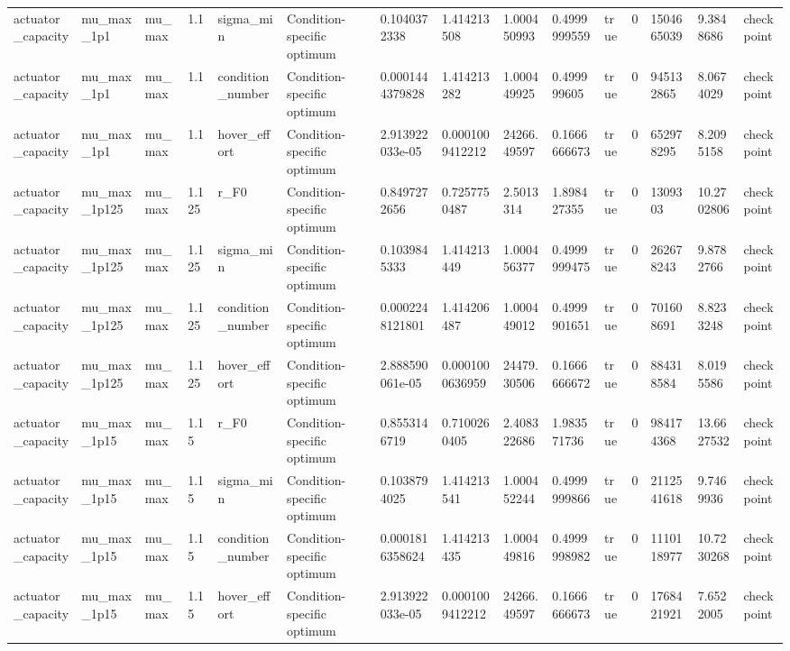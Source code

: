 \begin{tabular}{@{}lllllllllllllll@{}}
actuator\_capacity & mu\_max\_1p1 & mu\_max & 1.1 & sigma\_min & Condition-specific optimum & 0.1040372338 & 1.414213508 & 1.000450993 & 0.4999999559 & true & 0 & 1504665039 & 9.3848686 & checkpoint \\
actuator\_capacity & mu\_max\_1p1 & mu\_max & 1.1 & condition\_number & Condition-specific optimum & 0.0001444379828 & 1.414213282 & 1.000449925 & 0.499999605 & true & 0 & 945132865 & 8.0674029 & checkpoint \\
actuator\_capacity & mu\_max\_1p1 & mu\_max & 1.1 & hover\_effort & Condition-specific optimum & 2.913922033e-05 & 0.0001009412212 & 24266.49597 & 0.1666666673 & true & 0 & 652978295 & 8.2095158 & checkpoint \\
actuator\_capacity & mu\_max\_1p125 & mu\_max & 1.125 & r\_F0 & Condition-specific optimum & 0.8497272656 & 0.7257750487 & 2.5013314 & 1.898427355 & true & 0 & 1309303 & 10.2702806 & checkpoint \\
actuator\_capacity & mu\_max\_1p125 & mu\_max & 1.125 & sigma\_min & Condition-specific optimum & 0.1039845333 & 1.414213449 & 1.000456377 & 0.4999999475 & true & 0 & 262678243 & 9.8782766 & checkpoint \\
actuator\_capacity & mu\_max\_1p125 & mu\_max & 1.125 & condition\_number & Condition-specific optimum & 0.0002248121801 & 1.414206487 & 1.000449012 & 0.4999901651 & true & 0 & 701608691 & 8.8233248 & checkpoint \\
actuator\_capacity & mu\_max\_1p125 & mu\_max & 1.125 & hover\_effort & Condition-specific optimum & 2.888590061e-05 & 0.0001000636959 & 24479.30506 & 0.1666666672 & true & 0 & 884318584 & 8.0195586 & checkpoint \\
actuator\_capacity & mu\_max\_1p15 & mu\_max & 1.15 & r\_F0 & Condition-specific optimum & 0.8553146719 & 0.7100260405 & 2.408322686 & 1.983571736 & true & 0 & 984174368 & 13.6627532 & checkpoint \\
actuator\_capacity & mu\_max\_1p15 & mu\_max & 1.15 & sigma\_min & Condition-specific optimum & 0.1038794025 & 1.414213541 & 1.000452244 & 0.4999999866 & true & 0 & 2112541618 & 9.7469936 & checkpoint \\
actuator\_capacity & mu\_max\_1p15 & mu\_max & 1.15 & condition\_number & Condition-specific optimum & 0.0001816358624 & 1.414213435 & 1.000449816 & 0.4999998982 & true & 0 & 1110118977 & 10.7230268 & checkpoint \\
actuator\_capacity & mu\_max\_1p15 & mu\_max & 1.15 & hover\_effort & Condition-specific optimum & 2.913922033e-05 & 0.0001009412212 & 24266.49597 & 0.1666666673 & true & 0 & 1768421921 & 7.6522005 & checkpoint \\

\end{tabular}
